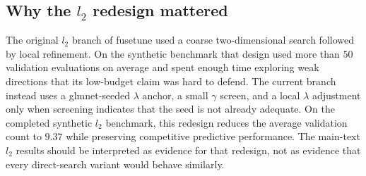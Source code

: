 \documentclass[pdflatex,iicol,sn-mathphys-num]{sn-jnl}
\newcommand{\codeid}{\texttt{fusetune}}
\def\texttt#1{#1}%
\def\codeid{fusetune}%
\def\ell{l}%
\begin{document}
\begin{appendices}
\section{Why the \texorpdfstring{\(\ell_2\)}{L2} redesign mattered}
The original \(\ell_2\) branch of \codeid{} used a coarse two-dimensional search followed by local refinement. On the synthetic benchmark that design used more than \(50\) validation evaluations on average and spent enough time exploring weak directions that its low-budget claim was hard to defend. The current branch instead uses a \texttt{glmnet}-seeded \(\lambda\) anchor, a small \(\gamma\) screen, and a local \(\lambda\) adjustment only when screening indicates that the seed is not already adequate. On the completed synthetic \(\ell_2\) benchmark, this redesign reduces the average validation count to \(9.37\) while preserving competitive predictive performance. The main-text \(\ell_2\) results should be interpreted as evidence for that redesign, not as evidence that every direct-search variant would behave similarly.

\end{appendices}

{\sloppy}
\end{document}
